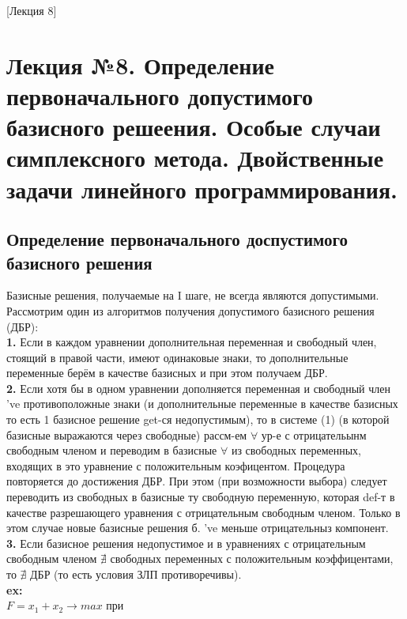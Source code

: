[Лекция 8]

\newpage

\section{Лекция №8. Определение первоначального допустимого базисного решеения. Особые случаи симплексного метода. Двойственные задачи линейного программирования.}
\subsection{Определение первоначального доспустимого базисного решения}
Базисные решения, получаемые на I шаге, не всегда являются допустимыми.\\
Рассмотрим один из алгоритмов получения допустимого базисного решения (ДБР):\\
\textbf{1.} Если в каждом уравнении дополнительная переменная и свободный член, стоящий в правой части, имеют одинаковые знаки, 
то дополнительные переменные берём в качестве базисных и при этом получаем ДБР.\\
\textbf{2.} Если хотя бы в одном уравнении дополняется переменная и свободный член 've противоположные знаки (и дополнительные  переменные в качестве базисных
то есть 1 базисное решение get-ся недопустимым), то в системе (1) (в которой базисные выражаются через свободные) рассм-ем $\forall$ ур-е с отрицательынм свободным членом и переводим в базисные $\forall$  из свободных переменных, входящих в это уравнение с положительным коэфицентом. Процедура повторяется до достижения ДБР.
При этом (при возможности выбора) следует переводить из свободных в базисные ту свободную переменную, которая def-т в качестве разрешающего уравнения с отрицательным свободным членом.
Только в этом случае новые базисные решения б. 've меньше отрицательныз компонент.\\
\textbf{3.} Если базисное решения недопустимое и в уравнениях с отрицательным свободным членом $\nexists$  свободных переменных с положительным коэффицентами, то $\nexists$ ДБР (то есть условия ЗЛП противоречивы). \\
\textbf{ex:}\\ 
$F=x_1+x_2 \rightarrow max$
при 
